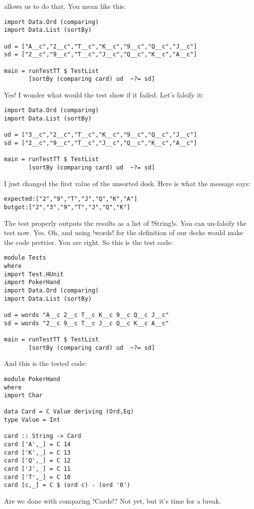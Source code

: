 allows us to do that.
\lhN You mean like this:
\begin{lstlisting}[frame=single]
import Data.Ord (comparing)
import Data.List (sortBy)

ud = ["A__c","2__c","T__c","K__c","9__c","Q__c","J__c"]
sd = ["2__c","9__c","T__c","J__c","Q__c","K__c","A__c"]

main = runTestTT $ TestList 
       [sortBy (comparing card) ud  ~?= sd]
\end{lstlisting} %
\hspace*{\fill}
\lhA \success Yes!
\lhN I wonder what would the test show if it failed. Let's falsify it:
\begin{lstlisting}[frame=single]
import Data.Ord (comparing)
import Data.List (sortBy)

ud = ["3__c","2__c","T__c","K__c","9__c","Q__c","J__c"]
sd = ["2__c","9__c","T__c","J__c","Q__c","K__c","A__c"]

main = runTestTT $ TestList 
       [sortBy (comparing card) ud  ~?= sd]
\end{lstlisting} %
I just changed the first value of the unsorted desk. 
\lhA \failure Here is what the message says:
\begin{small}
\begin{alltt}
expected: ["2\monoclubs","9\monoclubs","T\monoclubs","J\monoclubs","Q\monoclubs","K\monoclubs","A\monoclubs"]
 but got: ["2\monoclubs","3\monoclubs","9\monoclubs","T\monoclubs","J\monoclubs","Q\monoclubs","K\monoclubs"]
\end{alltt}
\end{small}
The test properly outputs the results as a list of \il!String!s. You can un-falsify the test now.
\lhN Yes.
\lhA Oh, and using \il!words! for the definition of our decks would make the code prettier.
\lhN You are right. So this is the test code:
\begin{lstlisting}[frame=single]
module Tests
where 
import Test.HUnit
import PokerHand
import Data.Ord (comparing)
import Data.List (sortBy)

ud = words "A__c 2__c T__c K__c 9__c Q__c J__c"
sd = words "2__c 9__c T__c J__c Q__c K__c A__c"

main = runTestTT $ TestList 
       [sortBy (comparing card) ud  ~?= sd]
\end{lstlisting} %
\hspace*{\fill}
\lhA \success And this is the tested code:
\begin{lstlisting}[frame=single]
module PokerHand
where
import Char

data Card = C Value deriving (Ord,Eq)
type Value = Int

card :: String -> Card
card ['A',_] = C 14
card ['K',_] = C 13
card ['Q',_] = C 12
card ['J',_] = C 11
card ['T',_] = C 10
card [c,_] = C $ (ord c) - (ord '0')
\end{lstlisting} %
\lhN Are we done with comparing \il!Cards!?
\lhA Not yet, but it's time for a break.
\lhend
